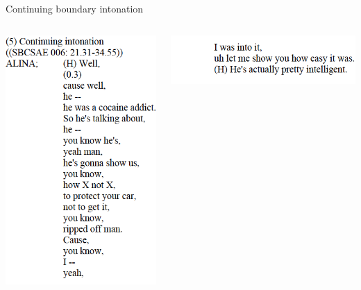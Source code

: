 \documentclass[compress,12pt]{beamer}%
\begin{document}
  \begin{frame}{Continuing boundary intonation}
    \begin{columns}[T]
    \begin{column}{0.4\textwidth}
    \includegraphics[width=1\textwidth]{images/Cont_Ex5.png}
    \end{column}
    \begin{column}{0.5\textwidth}
    \includegraphics[width=1\textwidth]{images/Cont_Ex5b.png}\\
    \hfill{}
    \end{column}
    \end{columns}
  \end{frame}  
  
\end{document}
